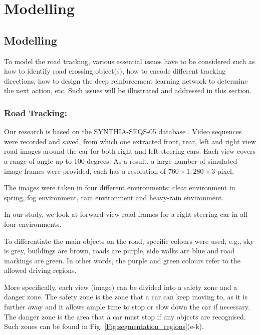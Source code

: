 \chapter{Modelling}

\section{Modelling}
To model the road tracking, various essential issues have to be considered such as how to identify road crossing object(s), how to encode different tracking directions, how to design the deep reinforcement learning network to determine the next action, etc. Such issues will be illustrated and addressed in this section.

\subsection{Road Tracking:} 
Our research is based on the SYNTHIA-SEQS-05 database \cite{Ros2016TheSYNTHIA}. Video sequences were recorded and saved, from which one extracted front,  rear, left and right view road images around the car for both right and left steering cars. Each view covers a range of angle up to 100 degrees. As a result, a large number of simulated image frames were provided, each has a resolution of $760 \times 1,280 \times 3$ pixel. 

The images were taken in four different environments: clear
environment in spring, fog environment, rain environment and
heavy-rain environment.

In our study, we look at forward view road frames for a right steering car in all four environments. 

To differentiate the main objects on the road, specific colours were used, e.g., sky is grey, buildings are brown, roads are purple, side walks are blue and road markings are green. In other words, the purple and green colours refer to the allowed driving regions.  

More specifically, each view (image) can be divided into a safety zone and a danger zone. The safety zone is the zone that a car can keep moving to, as it is further away and it allows ample time to stop or slow down the car if necessary. The danger zone is the area that a car must stop if any objects are recognised. Such zones can be found in Fig. \ref{Fig:segmentation_regions}(e-k). 

